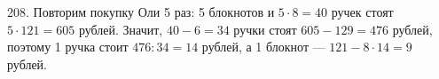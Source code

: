 208. Повторим покупку Оли 5 раз: 5 блокнотов и $5\cdot8=40$ ручек стоят $5\cdot121=605$ рублей. Значит, $40-6=34$ ручки стоят $605-129=476$ рублей, поэтому 1 ручка стоит $476:34=14$ рублей, а 1 блокнот --- $121-8\cdot14=9$ рублей.\\
